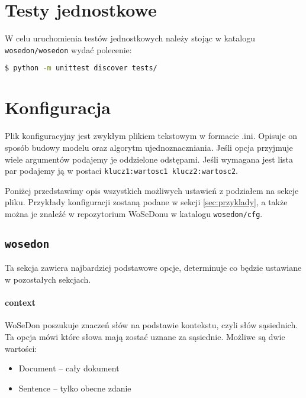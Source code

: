 \documentclass[10pt,a4paper]{article}
\begin{document}
\section{Testy jednostkowe}
W celu uruchomienia testów jednostkowych należy stojąc w katalogu \texttt{wosedon/wosedon} wydać polecenie:
\begin{lstlisting}[language=bash]
$ python -m unittest discover tests/
\end{lstlisting}



\section{Konfiguracja}
\label{sec:konfiguracja}
Plik konfiguracyjny jest zwykłym plikiem tekstowym w formacie .ini. Opisuje on sposób budowy modelu oraz algorytm ujednoznaczniania. Jeśli opcja przyjmuje wiele argumentów podajemy je oddzielone odstępami. Jeśli wymagana jest lista par podajemy ją w postaci \texttt{klucz1:wartosc1 klucz2:wartosc2}.

Poniżej przedstawimy opis wszystkich możliwych ustawień z podziałem na sekcje pliku. Przykłady konfiguracji zostaną podane w sekcji \ref{sec:przyklady}, a także można je znaleźć w repozytorium WoSeDonu w katalogu \texttt{wosedon/cfg}.

\subsection{\texttt{wosedon}}
Ta sekcja zawiera najbardziej podstawowe opcje, determinuje co będzie ustawiane w pozostałych sekcjach.

\paragraph{context}
WoSeDon poszukuje znaczeń słów na podstawie kontekstu, czyli słów sąsiednich. Ta opcja mówi które słowa mają zostać uznane za sąsiednie. Możliwe są dwie wartości:
\begin{itemize}
	\item Document -- cały dokument
	\item Sentence -- tylko obecne zdanie
\end{itemize}
\end{document}
